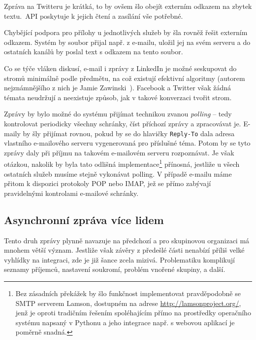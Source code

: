 \documentclass[12pt,oneside,final]{fithesis2}
\begin{document}
Zpráva na Twitteru je krátká, to by ovšem šlo obejít externím odkazem na zbytek textu.~API poskytuje k jejich čtení a zasílání vše potřebné.

Chybějící podpora pro přílohy u jednotlivých služeb by šla rovněž řešit externím odkazem. Systém by soubor přijal např. z e-mailu, uložil jej na svém serveru a do ostatních kanálů by poslal text s odkazem na tento soubor.

Co se týče vláken diskusí, e-mail i zprávy z LinkedIn je možné seskupovat do stromů minimálně podle předmětu, na což existují efektivní algoritmy (autorem nejznámnějšího z nich je Jamie Zawinski~\cite{zawinski2002message}). Facebook a Twitter však žádná témata neudržují a neexistuje způsob, jak v takové konverzaci tvořit strom.

Zprávy by bylo možné do systému přijímat technikou zvanou \emph{polling} -- tedy kontrolovat periodicky všechny schránky, číst příchozí zprávy a zpracovávat je. E-maily by šly přijímat rovnou, pokud by se do hlavičky {\tt Reply-To} dala adresa vlastního e-mailového serveru vygenerovaná pro příslušné téma. Potom by se tyto zprávy daly při příjmu na takovém e-mailovém serveru rozpoznávat. Je však otázkou, nakolik by byla tato odlišná implementace\footnote{Bez zásadních překážek by šlo funkčnost implementovat pravděpodobně se SMTP serverem Lamson, dostupném na adrese \url{http://lamsonproject.org/}, jenž je oproti tradičním řešením spoléhajícím přímo na prostředky operačního systému napsaný v Pythonu a jeho integrace např. s webovou aplikací je poměrně snadná.} přínosná, jestliže u všech ostatních služeb musíme stejně vykonávat polling. V případě e-mailu máme přitom k dispozici protokoly POP nebo IMAP, jež se přímo zabývají pravidelnými kontrolami e-mailové schránky.

\subsection{Asynchronní zpráva více lidem}
Tento druh zprávy plynně navazuje na předchozí a pro skupinovou organizaci má mnohem větší význam. Jestliže však závěry z předešlé části nenabízí příliš velké vyhlídky na integraci, zde je již šance zcela mizivá. Problematiku komplikují seznamy příjemců, nastavení soukromí, problém vnořené skupiny, a další.
\end{document}
